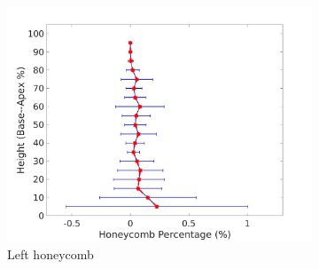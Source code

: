 \begin{figure}[H]
\begin{subfigure}{.42\linewidth}
  \includegraphics[width=\linewidth,trim={{.0\wd0} {.0\wd0} {.0\wd0} {.0\wd0}},clip]{QuantitativeAnalysis/Image/LeftLungHoneycombDiseaseAgainstHeight.jpg} %
  \caption{Left honeycomb}
  \label{fig:DiseaseAgainstHeight-e} 
\end{subfigure} 
\begin{subfigure}{.42\linewidth}%

\end{subfigure}
\end{figure}
